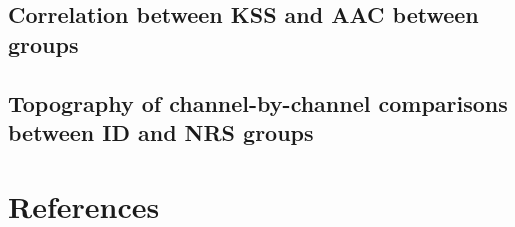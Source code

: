\documentclass[
]{article}
\begin{document}
\subsection{Correlation between KSS and AAC between
groups}\label{correlation-between-kss-and-aac-between-groups}

\subsection{Topography of channel-by-channel comparisons between ID and
NRS
groups}\label{topography-of-channel-by-channel-comparisons-between-id-and-nrs-groups}

\newpage

\footnotesize
\setlength{\parindent}{0in}

\section{References}\label{references}

\newpage
\end{document}
